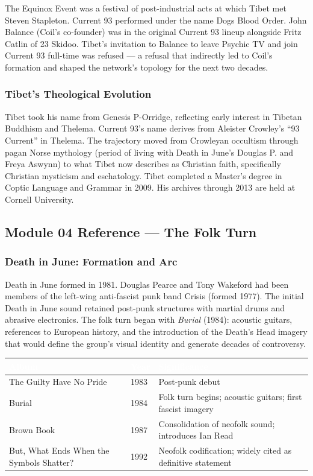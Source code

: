 \documentclass[11pt,letterpaper]{article}
\newcommand{\tableheader}[1]{\textbf{\sffamily\textcolor{white}{#1}}}
\begin{document}
The Equinox Event was a festival of post-industrial acts at which Tibet met Steven Stapleton.
Current 93 performed under the name Dogs Blood Order. John Balance (Coil's co-founder) was
in the original Current 93 lineup alongside Fritz Catlin of 23 Skidoo. Tibet's invitation to
Balance to leave Psychic TV and join Current 93 full-time was refused — a refusal that
indirectly led to Coil's formation and shaped the network's topology for the next two decades.

\subsubsection{Tibet's Theological Evolution}

Tibet took his name from Genesis P-Orridge, reflecting early interest in Tibetan Buddhism and
Thelema. Current 93's name derives from Aleister Crowley's ``93 Current'' in Thelema. The
trajectory moved from Crowleyan occultism through pagan Norse mythology (period of living with
Death in June's Douglas P. and Freya Aswynn) to what Tibet now describes as Christian faith,
specifically Christian mysticism and eschatology. Tibet completed a Master's degree in Coptic
Language and Grammar in 2009. His archives through 2013 are held at Cornell University.

\subsection{Module 04 Reference --- The Folk Turn}

\subsubsection{Death in June: Formation and Arc}

Death in June formed in 1981. Douglas Pearce and Tony Wakeford had been members of the
left-wing anti-fascist punk band Crisis (formed 1977). The initial Death in June sound retained
post-punk structures with martial drums and abrasive electronics. The folk turn began with
\textit{Burial} (1984): acoustic guitars, references to European history, and the introduction
of the Death's Head imagery that would define the group's visual identity and generate decades
of controversy.

\begin{center}
\begin{tabularx}{\textwidth}{L{4cm}L{2cm}X}
\toprule
{}
\tableheader{Album} & \tableheader{Year} & \tableheader{Significance} \\
\midrule
The Guilty Have No Pride & 1983 & Post-punk debut \\
Burial & 1984 & Folk turn begins; acoustic guitars; first fascist imagery \\
Brown Book & 1987 & Consolidation of neofolk sound; introduces Ian Read \\
But, What Ends When the Symbols Shatter? & 1992 & Neofolk codification; widely cited as definitive statement \\
\bottomrule
\end{tabularx}
\end{center}
\end{document}

